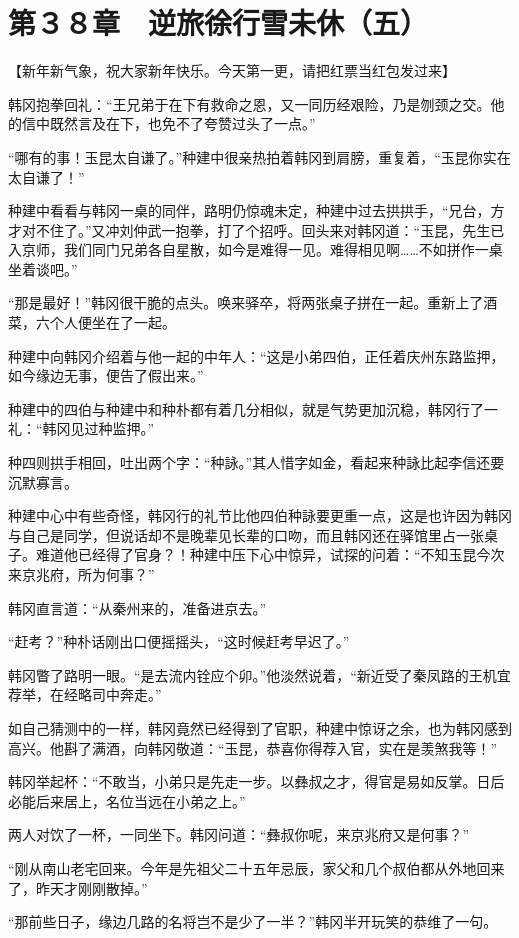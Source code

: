 \section{第３８章　逆旅徐行雪未休（五）}

【新年新气象，祝大家新年快乐。今天第一更，请把红票当红包发过来】

韩冈抱拳回礼：“王兄弟于在下有救命之恩，又一同历经艰险，乃是刎颈之交。他的信中既然言及在下，也免不了夸赞过头了一点。”

“哪有的事！玉昆太自谦了。”种建中很亲热拍着韩冈到肩膀，重复着，“玉昆你实在太自谦了！”

种建中看看与韩冈一桌的同伴，路明仍惊魂未定，种建中过去拱拱手，“兄台，方才对不住了。”又冲刘仲武一抱拳，打了个招呼。回头来对韩冈道：“玉昆，先生已入京师，我们同门兄弟各自星散，如今是难得一见。难得相见啊……不如拼作一桌坐着谈吧。”

“那是最好！”韩冈很干脆的点头。唤来驿卒，将两张桌子拼在一起。重新上了酒菜，六个人便坐在了一起。

种建中向韩冈介绍着与他一起的中年人：“这是小弟四伯，正任着庆州东路监押，如今缘边无事，便告了假出来。”

种建中的四伯与种建中和种朴都有着几分相似，就是气势更加沉稳，韩冈行了一礼：“韩冈见过种监押。”

种四则拱手相回，吐出两个字：“种詠。”其人惜字如金，看起来种詠比起李信还要沉默寡言。

种建中心中有些奇怪，韩冈行的礼节比他四伯种詠要更重一点，这是也许因为韩冈与自己是同学，但说话却不是晚辈见长辈的口吻，而且韩冈还在驿馆里占一张桌子。难道他已经得了官身？！种建中压下心中惊异，试探的问着：“不知玉昆今次来京兆府，所为何事？”

韩冈直言道：“从秦州来的，准备进京去。”

“赶考？”种朴话刚出口便摇摇头，“这时候赶考早迟了。”

韩冈瞥了路明一眼。“是去流内铨应个卯。”他淡然说着，“新近受了秦凤路的王机宜荐举，在经略司中奔走。”

如自己猜测中的一样，韩冈竟然已经得到了官职，种建中惊讶之余，也为韩冈感到高兴。他斟了满酒，向韩冈敬道：“玉昆，恭喜你得荐入官，实在是羡煞我等！”

韩冈举起杯：“不敢当，小弟只是先走一步。以彝叔之才，得官是易如反掌。日后必能后来居上，名位当远在小弟之上。”

两人对饮了一杯，一同坐下。韩冈问道：“彝叔你呢，来京兆府又是何事？”

“刚从南山老宅回来。今年是先祖父二十五年忌辰，家父和几个叔伯都从外地回来了，昨天才刚刚散掉。”

“那前些日子，缘边几路的名将岂不是少了一半？”韩冈半开玩笑的恭维了一句。

